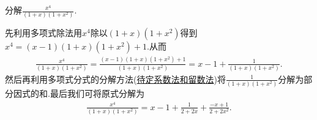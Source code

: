 \documentclass[../../main.tex]{subfiles}%
\begin{document}
\begin{example}
分解$\frac{x^4}{(1+x)(1+x^2)}$.
\end{example}
\begin{solution}
先利用多项式除法用$x^4$除以$(1+x)(1+x^2)$得到$x^4=\left( x-1 \right) \left( 1+x \right) \left( 1+x^2 \right) +1$.从而
\begin{align*}
\frac{x^4}{\left( 1+x \right) \left( 1+x^2 \right)}=\frac{\left( x-1 \right) \left( 1+x \right) \left( 1+x^2 \right) +1}{\left( 1+x \right) \left( 1+x^2 \right)}=x-1+\frac{1}{\left( 1+x \right) \left( 1+x^2 \right)}.
\end{align*}
然后再利用多项式分式的分解方法(\hyperref[将多项式分式分解为其部分因式的和常用方法]{待定系数法和留数法})将$\frac{1}{\left( 1+x \right) \left( 1+x^2 \right)}$分解为部分因式的和.最后我们可将原式分解为
\begin{align*}
\frac{x^4}{\left( 1+x \right) \left( 1+x^2 \right)}=x-1+\frac{1}{2+2x}+\frac{-x+1}{2+2x^2}.
\end{align*}

\end{solution}
\end{document}
